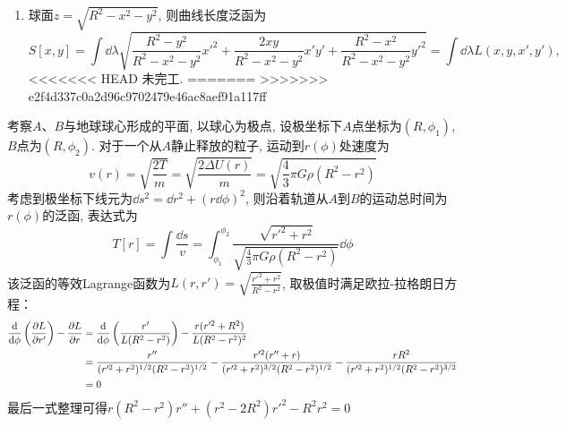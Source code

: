 \begin{solution}
\begin{enumerate}[label=(\arabic*)]
\begin{enumerate}[label=(\arabic{enumi}.\arabic*)]
            \item 球面\( z = \sqrt{R^2 - x^2 - y^2} \), 则曲线长度泛函为
            \[
                S[x,y] = \int \dd \lambda \sqrt{\frac{R^2 - y^2}{R^2 - x^2 - y^2} x'^2 + \frac{2xy}{R^2 - x^2 - y^2} x' y' + \frac{R^2 - x^2}{R^2 - x^2 - y^2} y'^2} = \int \dd \lambda L\left(x, y, x',y'\right),
            \]
<<<<<<< HEAD
            未完工.
=======
>>>>>>> e2f4d337c0a2d96c9702479e46ac8aef91a117ff
        \end{enumerate}
    \end{enumerate}
\end{solution}

\begin{solution}
    考察\(A\)、\(B\)与地球球心形成的平面, 以球心为极点, 设极坐标下\(A\)点坐标为\( (R,\phi_1) \), \(B\)点为\( (R,\phi_2) \). 
    对于一个从\(A\)静止释放的粒子, 运动到\( r(\phi) \)处速度为
    \[
        v(r) = \sqrt{\frac{2T}{m}} = \sqrt{\frac{2\Delta U(r)}{m}} = \sqrt{\frac43 \pi G \rho (R^2-r^2)}
    \]
    考虑到极坐标下线元为\( \dd s^2 = \dd r^2 + (r\dd \phi)^2 \), 则沿着轨道从\(A\)到\(B\)的运动总时间为\( r(\phi) \)的泛函, 表达式为
    \[
        T[r] = \int \frac{\dd s}{v}
             = \int_{\phi_1}^{\phi_2} \frac{ \sqrt{r'^2+r^2} }{ \sqrt{\frac43 \pi G \rho (R^2-r^2)} }\dd \phi
    \]
    该泛函的等效Lagrange函数为\( L(r,r')= \sqrt{\frac{r'^2+r^2}{R^2-r^2}} \), 取极值时满足欧拉-拉格朗日方程：
    \[
    \begin{aligned}
        \frac{\dd}{\dd \phi} \left( \frac{\partial L}{\partial r'} \right) - \frac{\partial L}{\partial r}
        & = \frac{\dd}{\dd \phi} \left( \frac{r'}{L(R^2-r^2)} \right) - \frac{r(r'^2+R^2)}{L(R^2-r^2)^2} \\
        & = \frac{r''}{(r'^2+r^2)^{1/2}(R^2-r^2)^{1/2}} - 
            \frac{r'^2(r''+r)}{(r'^2+r^2)^{3/2}(R^2-r^2)^{1/2}} - 
            \frac{rR^2}{(r'^2+r^2)^{1/2}(R^2-r^2)^{3/2}} \\
        & = 0
    \end{aligned}
    \]
    最后一式整理可得\( r(R^2-r^2)r''+(r^2-2R^2)r'^2-R^2r^2 = 0 \)
\end{solution}

